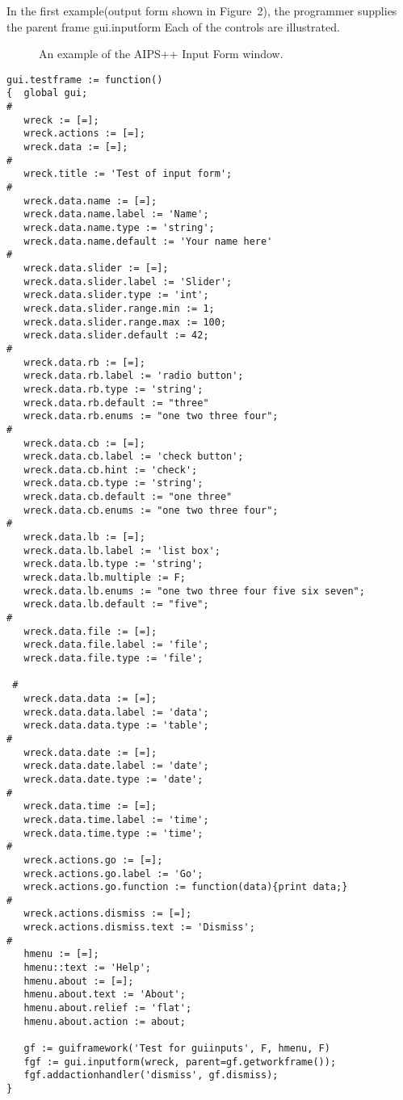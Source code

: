 In the first example(output form shown in Figure~2), the programmer supplies the parent frame gui.inputform
Each of the controls are illustrated.
\begin{figure}[here]
\caption{An example of the AIPS++ Input Form window.}
\end{figure}

\begin{verbatim}
gui.testframe := function()
{  global gui;
#
   wreck := [=];
   wreck.actions := [=];  
   wreck.data := [=];  
#
   wreck.title := 'Test of input form';
#
   wreck.data.name := [=];
   wreck.data.name.label := 'Name';
   wreck.data.name.type := 'string';
   wreck.data.name.default := 'Your name here'
#
   wreck.data.slider := [=];
   wreck.data.slider.label := 'Slider';
   wreck.data.slider.type := 'int';
   wreck.data.slider.range.min := 1;
   wreck.data.slider.range.max := 100;
   wreck.data.slider.default := 42;
#
   wreck.data.rb := [=];
   wreck.data.rb.label := 'radio button';
   wreck.data.rb.type := 'string';
   wreck.data.rb.default := "three"
   wreck.data.rb.enums := "one two three four";
#
   wreck.data.cb := [=];
   wreck.data.cb.label := 'check button';
   wreck.data.cb.hint := 'check';
   wreck.data.cb.type := 'string';
   wreck.data.cb.default := "one three"
   wreck.data.cb.enums := "one two three four";
#
   wreck.data.lb := [=];
   wreck.data.lb.label := 'list box';
   wreck.data.lb.type := 'string';
   wreck.data.lb.multiple := F;
   wreck.data.lb.enums := "one two three four five six seven";
   wreck.data.lb.default := "five";
#
   wreck.data.file := [=];
   wreck.data.file.label := 'file';
   wreck.data.file.type := 'file';

 #
   wreck.data.data := [=];
   wreck.data.data.label := 'data';
   wreck.data.data.type := 'table';
#
   wreck.data.date := [=];
   wreck.data.date.label := 'date';
   wreck.data.date.type := 'date';
#
   wreck.data.time := [=];
   wreck.data.time.label := 'time';
   wreck.data.time.type := 'time';
#
   wreck.actions.go := [=];
   wreck.actions.go.label := 'Go';
   wreck.actions.go.function := function(data){print data;}
#
   wreck.actions.dismiss := [=];
   wreck.actions.dismiss.text := 'Dismiss';
#
   hmenu := [=];
   hmenu::text := 'Help';
   hmenu.about := [=];
   hmenu.about.text := 'About';
   hmenu.about.relief := 'flat';
   hmenu.about.action := about;
 
   gf := guiframework('Test for guiinputs', F, hmenu, F)
   fgf := gui.inputform(wreck, parent=gf.getworkframe());
   fgf.addactionhandler('dismiss', gf.dismiss);
}
\end{verbatim}

